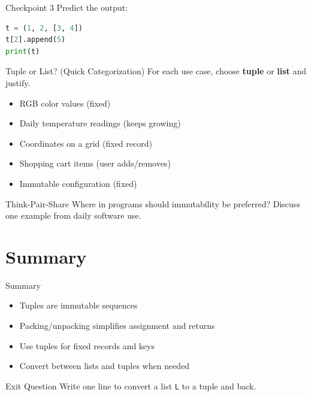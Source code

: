 \documentclass{beamer}
\begin{document}
\begin{frame}[fragile]{Checkpoint 3}
  Predict the output:
  \begin{lstlisting}[language=Python]
t = (1, 2, [3, 4])
t[2].append(5)
print(t)
  \end{lstlisting}
\end{frame}

\begin{frame}[fragile]{Tuple or List? (Quick Categorization)}
  For each use case, choose \textbf{tuple} or \textbf{list} and justify.
  \begin{itemize}[<+->]
    \item RGB color values (fixed)
    \item Daily temperature readings (keeps growing)
    \item Coordinates on a grid (fixed record)
    \item Shopping cart items (user adds/removes)
    \item Immutable configuration (fixed)
  \end{itemize}
\end{frame}

\begin{frame}[fragile]{Think-Pair-Share}
  Where in programs should immutability be preferred?
  Discuss one example from daily software use.
\end{frame}

\section{Summary}
\label{sec:summary}

\begin{frame}[fragile]{Summary}
  \begin{itemize}[<+->]
    \item Tuples are immutable sequences
    \item Packing/unpacking simplifies assignment and returns
    \item Use tuples for fixed records and keys
    \item Convert between lists and tuples when needed
  \end{itemize}
\end{frame}

\begin{frame}[fragile]{Exit Question}
  Write one line to convert a list \texttt{L} to a tuple and back.
\end{frame}
\end{document}
